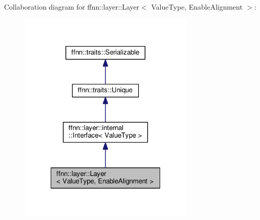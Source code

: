 Collaboration diagram for ffnn\-:\-:layer\-:\-:Layer$<$ Value\-Type, Enable\-Alignment $>$\-:
\nopagebreak
\begin{figure}[H]
\begin{center}
\leavevmode
\includegraphics[width=240pt]{classffnn_1_1layer_1_1_layer__coll__graph}
\end{center}
\end{figure}
